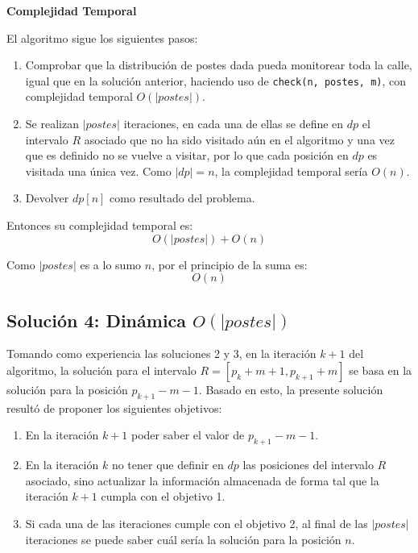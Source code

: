 \documentclass{article}
\begin{document}
\textbf{Complejidad Temporal}

El algoritmo sigue los siguientes pasos:
\begin{enumerate}
    \item Comprobar que la distribución de postes dada pueda monitorear toda la calle, igual que en la solución anterior, haciendo uso de \texttt{check(n, postes, m)}, con complejidad temporal \( O(|postes|) \).
    \item Se realizan \( |postes| \) iteraciones, en cada una de ellas se define en \( dp \) el intervalo \( R \) asociado que no ha sido visitado aún en el algoritmo y una vez que es definido no se vuelve a visitar, por lo que cada posición en \( dp \) es visitada una única vez. Como \( |dp| = n \), la complejidad temporal sería \( O(n) \).
    \item Devolver \( dp[n] \) como resultado del problema.
\end{enumerate}

Entonces su complejidad temporal es:
\[
O(|postes|) + O(n)
\]

Como \( |postes| \) es a lo sumo \( n \), por el principio de la suma es:
\[
O(n)
\]






\subsection{Solución 4: Dinámica \( O(|postes|) \)}

Tomando como experiencia las soluciones 2 y 3, en la iteración \( k + 1 \) del algoritmo, la solución para el intervalo \( R = [p_k + m + 1, p_{k+1} + m] \) se basa en la solución para la posición \( p_{k+1} - m - 1 \). Basado en esto, la presente solución resultó de proponer los siguientes objetivos:

\begin{enumerate}
    \item En la iteración \( k + 1 \) poder saber el valor de \( p_{k+1} - m - 1 \).
    \item En la iteración \( k \) no tener que definir en \( dp \) las posiciones del intervalo \( R \) asociado, sino actualizar la información almacenada de forma tal que la iteración \( k + 1 \) cumpla con el objetivo 1.
    \item Si cada una de las iteraciones cumple con el objetivo 2, al final de las \( |postes| \) iteraciones se puede saber cuál sería la solución para la posición \( n \).
\end{enumerate}
\end{document}
